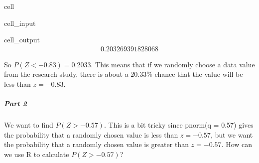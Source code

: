 \documentclass[letterpaper,10pt,english]{jupyterBook}
\begin{document}
\begin{sphinxuseclass}{cell}\begin{sphinxVerbatimInput}

\begin{sphinxuseclass}{cell_input}
\begin{sphinxVerbatim}[commandchars=\\\{\}]
\end{sphinxVerbatim}

\end{sphinxuseclass}\end{sphinxVerbatimInput}
\begin{sphinxVerbatimOutput}

\begin{sphinxuseclass}{cell_output}\begin{equation*}
\begin{split}0.203269391828068\end{split}
\end{equation*}
\end{sphinxuseclass}\end{sphinxVerbatimOutput}

\end{sphinxuseclass}
\sphinxAtStartPar
So \(P(Z < -0.83) = 0.2033\). This means that if we randomly choose a data value from the research study, there is about a \(20.33\%\) chance that the value will be less than \(z = -0.83\).


\subparagraph{Part 2}
\label{\detokenize{Ch4 The Normal Distribution and the Central Limit Theorem/4.2 The Standard Normal Distribution:part-2}}
\sphinxAtStartPar
We want to find \(P(Z > -0.57)\). This is a bit tricky since pnorm(q = \sphinxhyphen{}0.57) gives the probability that a randomly chosen value is less than \(z = -0.57\), but we want the probability that a randomly chosen value is greater than \(z = -0.57\). How can we use R to calculate \(P(Z > -0.57)\)?
\end{document}
